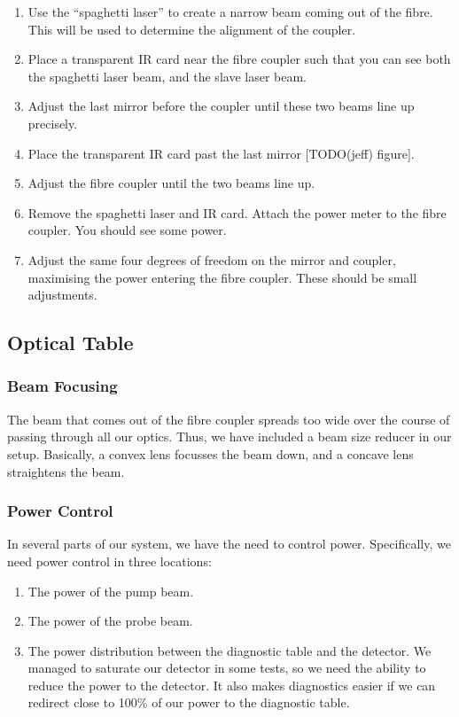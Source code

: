 \begin{enumerate}
 \item Use the ``spaghetti laser'' to create a narrow beam coming out of the fibre.  This will be used to determine the alignment of the coupler.
 \item Place a transparent IR card near the fibre coupler such that you can see both the spaghetti laser beam, and the slave laser beam.
 \item Adjust the last mirror before the coupler until these two beams line up precisely.
 \item Place the transparent IR card past the last mirror [TODO(jeff) figure].
 \item Adjust the fibre coupler until the two beams line up.
 \item Remove the spaghetti laser and IR card.  Attach the power meter to the fibre coupler.  You should see some power.
 \item Adjust the same four degrees of freedom on the mirror and coupler, maximising the power entering the fibre coupler.  These should be small adjustments.
\end{enumerate}

\subsection{Optical Table}
    \subsubsection{Beam Focusing}
    
The beam that comes out of the fibre coupler spreads too wide over the course of passing through all our optics.  Thus, we have included a beam size reducer in our setup.  Basically, a convex lens focusses the beam down, and a concave lens straightens the beam.

    \subsubsection{Power Control}
    
In several parts of our system, we have the need to control power.  Specifically, we need power control in three locations:

\begin{enumerate}
    \item The power of the pump beam.
    \item The power of the probe beam.
    \item The power distribution between the diagnostic table and the detector.  We managed to saturate our detector in some tests, so we need the ability to reduce the power to the detector.  It also makes diagnostics easier if we can redirect close to 100\% of our power to the diagnostic table.
\end{enumerate}

